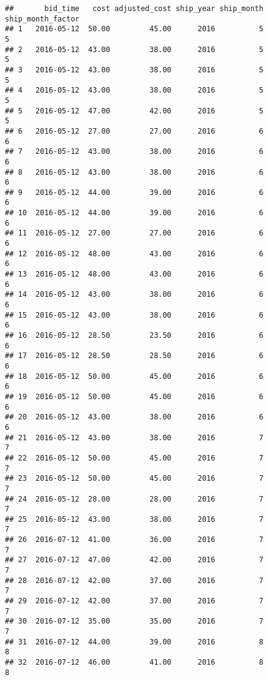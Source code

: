 \documentclass[]{article}
\begin{document}
\begin{verbatim}
##       bid_time   cost adjusted_cost ship_year ship_month ship_month_factor
## 1   2016-05-12  50.00         45.00      2016          5                 5
## 2   2016-05-12  43.00         38.00      2016          5                 5
## 3   2016-05-12  43.00         38.00      2016          5                 5
## 4   2016-05-12  43.00         38.00      2016          5                 5
## 5   2016-05-12  47.00         42.00      2016          5                 5
## 6   2016-05-12  27.00         27.00      2016          6                 6
## 7   2016-05-12  43.00         38.00      2016          6                 6
## 8   2016-05-12  43.00         38.00      2016          6                 6
## 9   2016-05-12  44.00         39.00      2016          6                 6
## 10  2016-05-12  44.00         39.00      2016          6                 6
## 11  2016-05-12  27.00         27.00      2016          6                 6
## 12  2016-05-12  48.00         43.00      2016          6                 6
## 13  2016-05-12  48.00         43.00      2016          6                 6
## 14  2016-05-12  43.00         38.00      2016          6                 6
## 15  2016-05-12  43.00         38.00      2016          6                 6
## 16  2016-05-12  28.50         23.50      2016          6                 6
## 17  2016-05-12  28.50         28.50      2016          6                 6
## 18  2016-05-12  50.00         45.00      2016          6                 6
## 19  2016-05-12  50.00         45.00      2016          6                 6
## 20  2016-05-12  43.00         38.00      2016          6                 6
## 21  2016-05-12  43.00         38.00      2016          7                 7
## 22  2016-05-12  50.00         45.00      2016          7                 7
## 23  2016-05-12  50.00         45.00      2016          7                 7
## 24  2016-05-12  28.00         28.00      2016          7                 7
## 25  2016-05-12  43.00         38.00      2016          7                 7
## 26  2016-07-12  41.00         36.00      2016          7                 7
## 27  2016-07-12  47.00         42.00      2016          7                 7
## 28  2016-07-12  42.00         37.00      2016          7                 7
## 29  2016-07-12  42.00         37.00      2016          7                 7
## 30  2016-07-12  35.00         35.00      2016          7                 7
## 31  2016-07-12  44.00         39.00      2016          8                 8
## 32  2016-07-12  46.00         41.00      2016          8                 8

\end{verbatim}
\end{document}
